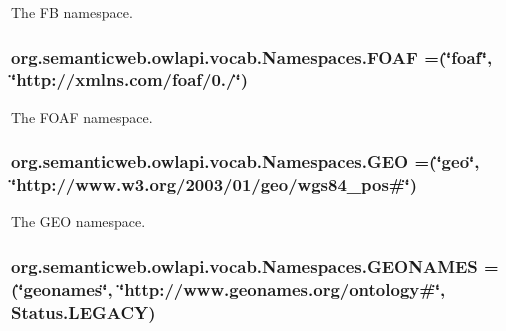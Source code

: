 The F\-B namespace. \hypertarget{enumorg_1_1semanticweb_1_1owlapi_1_1vocab_1_1_namespaces_a1e93a930595d029ff7b9ee6f6f596337}{
\subsubsection[{F\-O\-A\-F}]{\setlength{\rightskip}{0pt plus 5cm}org.\-semanticweb.\-owlapi.\-vocab.\-Namespaces.\-F\-O\-A\-F =(\char`\"{}foaf\char`\"{}, \char`\"{}http\-://xmlns.\-com/foaf/0./\char`\"{})}}\label{enumorg_1_1semanticweb_1_1owlapi_1_1vocab_1_1_namespaces_a1e93a930595d029ff7b9ee6f6f596337}
The F\-O\-A\-F namespace. \hypertarget{enumorg_1_1semanticweb_1_1owlapi_1_1vocab_1_1_namespaces_a0332c5ce60a0fa40011d3ca833e5af57}{
\subsubsection[{G\-E\-O}]{\setlength{\rightskip}{0pt plus 5cm}org.\-semanticweb.\-owlapi.\-vocab.\-Namespaces.\-G\-E\-O =(\char`\"{}geo\char`\"{}, \char`\"{}http\-://www.\-w3.\-org/2003/01/geo/wgs84\-\_\-pos\#\char`\"{})}}\label{enumorg_1_1semanticweb_1_1owlapi_1_1vocab_1_1_namespaces_a0332c5ce60a0fa40011d3ca833e5af57}
The G\-E\-O namespace. \hypertarget{enumorg_1_1semanticweb_1_1owlapi_1_1vocab_1_1_namespaces_a82034d899a5122b1b7aa79ef1e8b7585}{
\subsubsection[{G\-E\-O\-N\-A\-M\-E\-S}]{\setlength{\rightskip}{0pt plus 5cm}org.\-semanticweb.\-owlapi.\-vocab.\-Namespaces.\-G\-E\-O\-N\-A\-M\-E\-S =(\char`\"{}geonames\char`\"{}, \char`\"{}http\-://www.\-geonames.\-org/ontology\#\char`\"{}, Status.\-L\-E\-G\-A\-C\-Y)}}\label{enumorg_1_1semanticweb_1_1owlapi_1_1vocab_1_1_namespaces_a82034d899a5122b1b7aa79ef1e8b7585}
